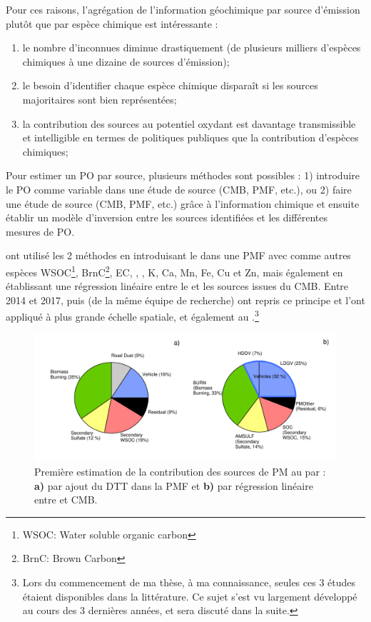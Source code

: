 Pour ces raisons, l'agrégation de l'information géochimique par source d'émission plutôt
que par espèce chimique est intéressante :
\begin{enumerate}
    \item le nombre d'inconnues diminue drastiquement (de plusieurs milliers d'espèces
        chimiques à une dizaine de sources d'émission);
    \item le besoin d'identifier chaque espèce chimique disparaît si les sources
        majoritaires sont bien représentées;
    \item la contribution des sources au potentiel oxydant est davantage transmissible et
        intelligible en termes de politiques publiques que la contribution d'espèces
        chimiques;
\end{enumerate}

Pour estimer un PO par source, plusieurs méthodes sont possibles : 1) introduire le PO
comme variable dans une étude de source (CMB, PMF, etc.), ou 2) faire une étude de source
(CMB, PMF, etc.) grâce à l'information chimique et ensuite établir un modèle d'inversion
entre les sources identifiées et les différentes mesures de PO.

\cite{vermaReactive2014} ont utilisé les 2 méthodes en introduisant le \PODTT{} dans une
PMF avec comme autres espèces WSOC\footnote{WSOC: Water soluble organic carbon},
BrnC\footnote{BrnC: Brown Carbon}, EC, \SOq, \NHt, K, Ca, Mn, Fe, Cu et Zn, mais également
en établissant une régression linéaire entre le \PODTT{} et les sources issues du CMB.
Entre 2014 et 2017, \cite{batesReactive2015} puis \cite{fangOxidative2016} (de la même
équipe de recherche) ont repris ce principe et l'ont appliqué à plus grande échelle
spatiale, et également au \POAAv.\footnote{Lors du commencement de ma thèse, à ma
    connaissance, seules ces 3 études étaient disponibles dans la littérature. Ce sujet
s'est vu largement développé au cours des 3 dernières années, et sera discuté dans la
suite.}

\begin{figure}[ht]
    \centering
    \includegraphics[width=1.0\linewidth]{figures/chapter04/verma_2014_fig8.pdf}
    \caption{Première estimation de la contribution des sources de PM au \PODTT{} par
        \cite[][figure 8]{vermaReactive2014}: \textbf{a)} par ajout du DTT dans la PMF et
        \textbf{b)} par régression linéaire entre \PODTT{} et CMB.
    }%
    \label{fig:figures/chapter04/verma_2014_fig8}
\end{figure}

